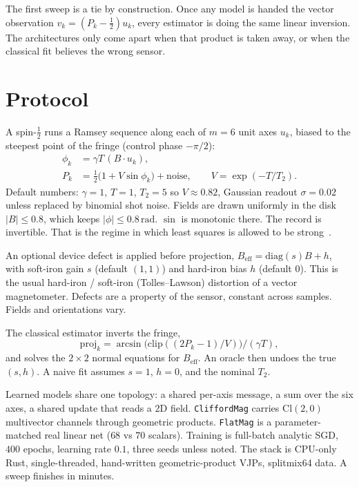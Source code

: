 \documentclass[11pt]{article}
\begin{document}
The first sweep is a tie by construction.
Once any model is handed the vector observation $v_k=(P_k-\tfrac12)u_k$, every estimator is doing the same linear inversion.
The architectures only come apart when that product is taken away, or when the classical fit believes the wrong sensor.

\section{Protocol}

A spin-$\tfrac12$ runs a Ramsey sequence along each of $m=6$ unit axes $u_k$, biased to the steepest point of the fringe (control phase $-\pi/2$):
\begin{align}
\phi_k &= \gamma T\,(B\cdot u_k),\\
P_k &= \tfrac12\bigl(1+V\sin\phi_k\bigr)+\mathrm{noise},\qquad
V=\exp(-T/T_2).
\end{align}
Default numbers: $\gamma=1$, $T=1$, $T_2=5$ so $V\approx 0.82$, Gaussian readout $\sigma=0.02$ unless replaced by binomial shot noise.
Fields are drawn uniformly in the disk $|B|\le 0.8$, which keeps $|\phi|\le 0.8\,\mathrm{rad}$.
$\sin$ is monotonic there.
The record is invertible.
That is the regime in which least squares is allowed to be strong~\citep{taylor2008,maze2008}.

An optional device defect is applied before projection,
$B_{\mathrm{eff}}=\mathrm{diag}(s)B+h$,
with soft-iron gain $s$ (default $(1,1)$) and hard-iron bias $h$ (default $0$).
This is the usual hard-iron / soft-iron (Tolles--Lawson) distortion of a vector magnetometer.
Defects are a property of the sensor, constant across samples.
Fields and orientations vary.

The classical estimator inverts the fringe,
\begin{equation}
\mathrm{proj}_k=\arcsin\bigl(\mathrm{clip}((2P_k-1)/V)\bigr)/(\gamma T),
\end{equation}
and solves the $2\times 2$ normal equations for $B_{\mathrm{eff}}$.
An oracle then undoes the true $(s,h)$.
A naive fit assumes $s=1$, $h=0$, and the nominal $T_2$.

Learned models share one topology: a shared per-axis message, a sum over the six axes, a shared update that reads a 2D field.
\texttt{CliffordMag} carries $\mathrm{Cl}(2,0)$ multivector channels through geometric products.
\texttt{FlatMag} is a parameter-matched real linear net ($68$ vs $70$ scalars).
Training is full-batch analytic SGD, $400$ epochs, learning rate $0.1$, three seeds unless noted.
The stack is CPU-only Rust, single-threaded, hand-written geometric-product VJPs, splitmix64 data.
A sweep finishes in minutes.
\end{document}
